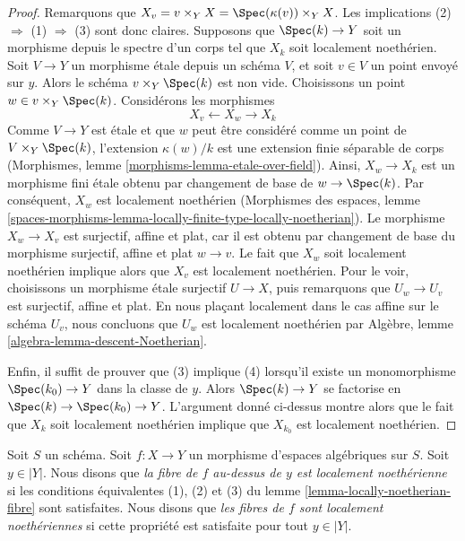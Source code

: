 \begin{proof}
Remarquons que $X_v = v \times_Y X = \Spec(\kappa(v)) \times_Y X$.
Les implications (2) $\Rightarrow$ (1) $\Rightarrow$ (3) sont donc claires.
Supposons que $\Spec(k) \to Y$ soit un morphisme depuis le spectre d'un corps
tel que $X_k$ soit localement noethérien. Soit $V \to Y$ un morphisme \'etale
depuis un schéma $V$, et soit $v \in V$ un point envoyé sur $y$.
Alors le schéma $v \times_Y \Spec(k)$ est non vide. Choisissons un
point $w \in v \times_Y \Spec(k)$. Considérons les morphismes
$$
X_v \longleftarrow X_w \longrightarrow X_k
$$
Comme $V \to Y$ est \'etale et que $w$ peut être considéré comme un point de
$V \times_Y \Spec(k)$, l'extension $\kappa(w)/k$
est une extension finie séparable de corps
(Morphismes, lemme \ref{morphisms-lemma-etale-over-field}).
Ainsi, $X_w \to X_k$ est un morphisme fini \'etale obtenu par changement de base de
$w \to \Spec(k)$. Par conséquent, $X_w$ est localement noethérien
(Morphismes des espaces, lemme
\ref{spaces-morphisms-lemma-locally-finite-type-locally-noetherian}).
Le morphisme $X_w \to X_v$ est surjectif, affine et plat,
car il est obtenu par changement de base du morphisme surjectif, affine et plat $w \to v$.
Le fait que $X_w$ soit localement noethérien implique alors que
$X_v$ est localement noethérien. Pour le voir, choisissons un morphisme
\'etale surjectif $U \to X$, puis remarquons que
$U_w \to U_v$ est surjectif, affine et plat. En nous plaçant
localement dans le cas affine sur le schéma $U_v$, nous concluons
que $U_w$ est localement noethérien par
Algèbre, lemme \ref{algebra-lemma-descent-Noetherian}.

\medskip\noindent
Enfin, il suffit de prouver que (3) implique (4)
lorsqu'il existe un monomorphisme $\Spec(k_0) \to Y$ dans la classe de $y$.
Alors $\Spec(k) \to Y$ se factorise en $\Spec(k) \to \Spec(k_0) \to Y$.
L'argument donné ci-dessus montre alors que le fait que $X_k$ soit
localement noethérien implique que $X_{k_0}$ est localement noethérien.
\end{proof}

\begin{definition}
\label{definition-locally-Noetherian-fibre}
Soit $S$ un schéma. Soit $f : X \to Y$ un morphisme d'espaces algébriques
sur $S$. Soit $y \in |Y|$. Nous disons que {\it la fibre de $f$ au-dessus de $y$ est
localement noethérienne} si les conditions équivalentes (1), (2) et (3)
du lemme \ref{lemma-locally-noetherian-fibre} sont satisfaites.
Nous disons que {\it les fibres de $f$ sont localement noethériennes} si cette propriété
est satisfaite pour tout $y \in |Y|$.
\end{definition}

